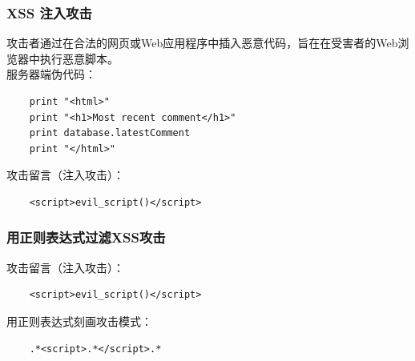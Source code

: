 \documentclass[landscape]{beamer}
\begin{document}
\begin{frame}[fragile,t]
  \frametitle{XSS 注入攻击}
  攻击者通过在合法的网页或Web应用程序中插入恶意代码，旨在在受害者的Web浏览器中执行恶意脚本。\\
  \vspace{\baselineskip}
  服务器端伪代码：
  \begin{lstlisting}
    print "<html>"
    print "<h1>Most recent comment</h1>"
    print database.latestComment
    print "</html>"
  \end{lstlisting}
  \vspace{\baselineskip}
  攻击留言（注入攻击）：
  \begin{lstlisting}
    <script>evil_script()</script>
  \end{lstlisting}
\end{frame}
\begin{frame}[fragile,t]
  \frametitle{用正则表达式过滤XSS攻击}
  攻击留言（注入攻击）：
  \begin{lstlisting}
    <script>evil_script()</script>
  \end{lstlisting}
  \vspace{\baselineskip}
  用正则表达式刻画攻击模式：
  \begin{lstlisting}
    .*<script>.*</script>.*
  \end{lstlisting}
\end{frame}
\end{document}

